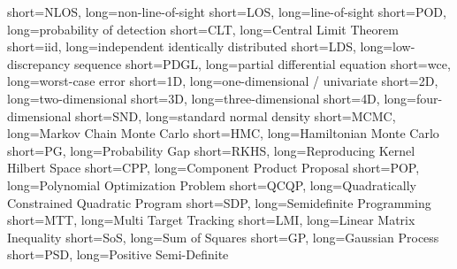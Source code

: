 		{short={NLOS},	    	long={non-line-of-sight}}
		{short={LOS},	    	long={line-of-sight}}
		{short={POD},	    	long={probability of detection}}
		{short={CLT},	    	long={Central Limit Theorem}}
		{short={iid},	    	long={independent identically distributed}}
		{short={LDS},	    	long={low-discrepancy sequence}}
		{short={PDGL},	    	long={partial differential equation}}
		{short={wce},	    	long={worst-case error}}
		    {short={1D},	    	long={one-dimensional / univariate}}
		    {short={2D},	    	long={two-dimensional}}
		    {short={3D},	    	long={three-dimensional}}
		    {short={4D},	    	long={four-dimensional}}
		{short={SND},	    	long={standard normal density}}
		{short={MCMC},	    	long={Markov Chain Monte Carlo}}
		{short={HMC},	    	long={Hamiltonian Monte Carlo}}
		    {short={PG},	    	long={Probability Gap}}
		{short={RKHS},	    	long={Reproducing Kernel Hilbert Space}}
		{short={CPP},	    	long={Component Product Proposal}}
		{short={POP},	    	long={Polynomial Optimization Problem}}
		{short={QCQP},	    	long={Quadratically Constrained Quadratic Program}}
		{short={SDP},	    	long={Semidefinite Programming}}
		{short={MTT},	    	long={Multi Target Tracking}}
		{short={LMI},	    	long={Linear Matrix Inequality}}
		{short={SoS},	    	long={Sum of Squares}}
		    {short={GP},	    	long={Gaussian Process}}
	    {short={PSD},	    	long={Positive Semi-Definite}}



